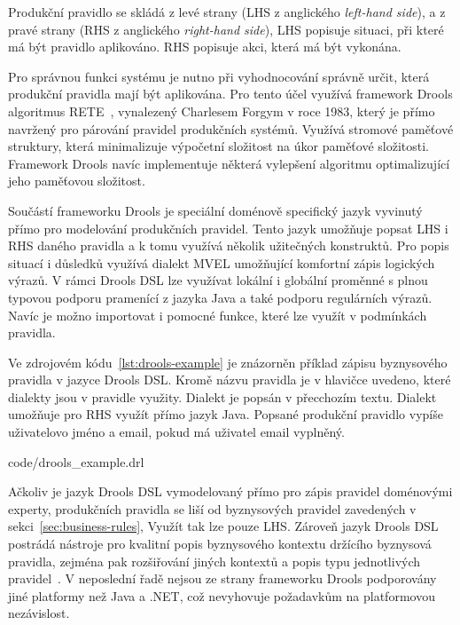 Produkční pravidlo se skládá z levé strany (\gls{LHS} z anglického \textit{left-hand side}),
a z pravé strany (\gls{RHS} z anglického \textit{right-hand side}),
\gls{LHS} popisuje situaci, při které má být pravidlo aplikováno. \gls{RHS} popisuje akci,
která má být vykonána.

Pro správnou funkci systému je nutno při vyhodnocování správně určit, která produkční pravidla
mají být aplikována. Pro tento účel využívá framework Drools algoritmus RETE~\cite{forgy1988rete},
vynalezený Charlesem Forgym v roce 1983, který je přímo navržený pro párování pravidel produkčních systémů.
Využívá stromové paměťové struktury, která minimalizuje výpočetní složitost na úkor paměťové složitosti. Framework
Drools navíc implementuje některá vylepšení algoritmu optimalizující jeho paměťovou složitost.

Součástí frameworku Drools je speciální doménově specifický jazyk vyvinutý přímo
pro modelování produkčních pravidel. Tento jazyk umožňuje popsat \gls{LHS} i \gls{RHS}
daného pravidla a k tomu využívá několik užitečných konstruktů. Pro popis situací i důsledků
využívá dialekt MVEL umožňující komfortní zápis logických výrazů. V rámci Drools \gls{DSL}
lze využívat lokální i globální proměnné s plnou typovou podporu pramenící z jazyka Java a také
podporu regulárních výrazů. Navíc je možno importovat i pomocné funkce, které lze
využít v podmínkách pravidla.

Ve zdrojovém kódu~\ref{lst:drools-example} je znázorněn příklad zápisu
byznysového pravidla v jazyce Drools DSL. Kromě názvu pravidla je v hlavičce
uvedeno, které dialekty jsou v pravidle využity. Dialekt  je popsán v přecchozím textu.
Dialekt  umožňuje pro \gls{RHS} využít přímo jazyk Java. Popsané produkční pravidlo
vypíše uživatelovo jméno a email, pokud má uživatel email vyplněný.


{code/drools_example.drl}

Ačkoliv je jazyk Drools \gls{DSL} vymodelovaný přímo pro zápis pravidel doménovými experty,
produkčních pravidla se liší od byznysových pravidel zavedených v sekci~\ref{sec:business-rules},
Využít tak lze pouze \gls{LHS}. Zároveň jazyk Drools \gls{DSL} postrádá
nástroje pro kvalitní popis byznysového kontextu držícího byznysová pravidla,
zejména pak rozšiřování jiných kontextů a popis typu jednotlivých pravidel~\cite{cemus2017automated}.
V neposlední řadě nejsou ze strany frameworku Drools podporovány jiné platformy než
Java a .NET, což nevyhovuje požadavkům na platformovou nezávislost.

